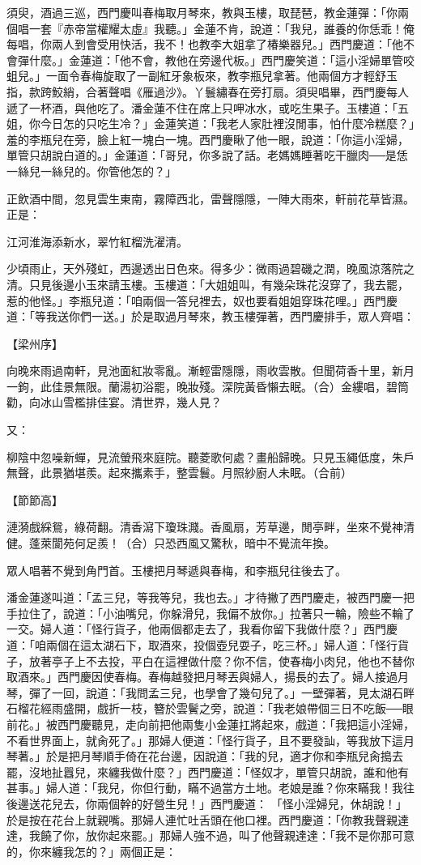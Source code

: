 須臾，酒過三巡，西門慶叫春梅取月琴來，教與玉樓，取琵琶，教金蓮彈：「你兩個唱一套『赤帝當權耀太虛』我聽。」金蓮不肯，說道：「我兒，誰養的你恁乖！俺每唱，你兩人到會受用快活，我不！也教李大姐拿了椿樂器兒。」西門慶道：「他不會彈什麼。」金蓮道：「他不會，教他在旁邊代板。」西門慶笑道：「這小淫婦單管咬蛆兒。」一面令春梅旋取了一副紅牙象板來，教李瓶兒拿著。他兩個方才輕舒玉指，款跨鮫綃，合著聲唱《雁過沙》。丫鬟繡春在旁打扇。須臾唱畢，西門慶每人遞了一杯酒，與他吃了。潘金蓮不住在席上只呷冰水，或吃生果子。玉樓道：「五姐，你今日怎的只吃生冷？」金蓮笑道：「我老人家肚裡沒閒事，怕什麼冷糕麼？」羞的李瓶兒在旁，臉上紅一塊白一塊。西門慶瞅了他一眼，說道：「你這小淫婦，單管只胡說白道的。」金蓮道：「哥兒，你多說了話。老媽媽睡著吃干臘肉──是恁一絲兒一絲兒的。你管他怎的？」

正飲酒中間，忽見雲生東南，霧障西北，雷聲隱隱，一陣大雨來，軒前花草皆濕。正是：

江河淮海添新水，翠竹紅榴洗濯清。

少頃雨止，天外殘虹，西邊透出日色來。得多少：微雨過碧磯之潤，晚風涼落院之清。只見後邊小玉來請玉樓。玉樓道：「大姐姐叫，有幾朵珠花沒穿了，我去罷，惹的他怪。」李瓶兒道：「咱兩個一答兒裡去，奴也要看姐姐穿珠花哩。」西門慶道：「等我送你們一送。」於是取過月琴來，教玉樓彈著，西門慶排手，眾人齊唱：

【梁州序】

向晚來雨過南軒，見池面紅妝零亂。漸輕雷隱隱，雨收雲散。但聞荷香十里，新月一鉤，此佳景無限。蘭湯初浴罷，晚妝殘。深院黃昏懶去眠。（合）金縷唱，碧筒勸，向冰山雪檻排佳宴。清世界，幾人見？

又：

柳陰中忽噪新蟬，見流螢飛來庭院。聽菱歌何處？畫船歸晚。只見玉繩低度，朱戶無聲，此景猶堪羨。起來攜素手，整雲鬟。月照紗廚人未眠。（合前）

【節節高】

漣漪戲綵鴛，綠荷翻。清香瀉下瓊珠濺。香風扇，芳草邊，閒亭畔，坐來不覺神清健。蓬萊閬苑何足羨！（合）只恐西風又驚秋，暗中不覺流年換。

眾人唱著不覺到角門首。玉樓把月琴遞與春梅，和李瓶兒往後去了。

潘金蓮遂叫道：「孟三兒，等我等兒，我也去。」才待撇了西門慶走，被西門慶一把手拉住了，說道：「小油嘴兒，你躲滑兒，我偏不放你。」拉著只一輪，險些不輪了一交。婦人道：「怪行貨子，他兩個都走去了，我看你留下我做什麼？」西門慶道：「咱兩個在這太湖石下，取酒來，投個壺兒耍子，吃三杯。」婦人道：「怪行貨子，放著亭子上不去投，平白在這裡做什麼？你不信，使春梅小肉兒，他也不替你取酒來。」西門慶因使春梅。春梅越發把月琴丟與婦人，揚長的去了。婦人接過月琴，彈了一回，說道：「我問孟三兒，也學會了幾句兒了。」一壁彈著，見太湖石畔石榴花經雨盛開，戲折一枝，簪於雲鬢之旁，說道：「我老娘帶個三日不吃飯──眼前花。」被西門慶聽見，走向前把他兩隻小金蓮扛將起來，戲道：「我把這小淫婦，不看世界面上，就肏死了。」那婦人便道：「怪行貨子，且不要發訕，等我放下這月琴著。」於是把月琴順手倚在花台邊，因說道：「我的兒，適才你和李瓶兒肏搗去罷，沒地扯囂兒，來纏我做什麼？」西門慶道：「怪奴才，單管只胡說，誰和他有甚事。」婦人道：「我兒，你但行動，瞞不過當方土地。老娘是誰？你來瞞我！我往後邊送花兒去，你兩個幹的好營生兒！」西門慶道： 「怪小淫婦兒，休胡說！」於是按在花台上就親嘴。那婦人連忙吐舌頭在他口裡。西門慶道：「你教我聲親達達，我饒了你，放你起來罷。」那婦人強不過，叫了他聲親達達：「我不是你那可意的，你來纏我怎的？」兩個正是：


